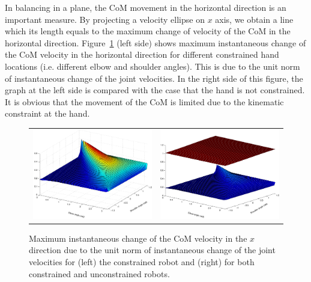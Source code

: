 \documentclass[final,5p,twocolumn]{elsarticle}
\begin{document}
In balancing in a plane, the CoM movement in the horizontal direction is an
important measure. By projecting a velocity ellipse on $x$ axis, we obtain a
line which its length equals to the maximum change of velocity of the CoM in
the horizontal direction. Figure~\ref{type2} (left side) shows maximum
instantaneous change of the CoM velocity in the horizontal direction for
different constrained hand locations (i.e. different elbow and shoulder
angles). This is due to the unit norm of instantaneous change of the joint
velocities. In the right side of this figure, the graph at the left side is
compared with the case that the hand is not constrained. It is obvious that
the movement of the CoM is limited due to the kinematic constraint at the
hand.
\begin{figure}[!t]
  \centering
  \begin{tabular}{lr}
    \includegraphics[width=0.5\linewidth]{images/type2_2.pdf}
    &  
    \includegraphics[width=0.5\linewidth]{images/type2.pdf}
  \end{tabular}
  \caption{Maximum instantaneous change of the CoM velocity in the $x$
    direction due to the unit norm of instantaneous change of the joint
    velocities for (left) the constrained robot and (right) for both
    constrained and unconstrained robots.}
  \label{type2}
\end{figure}
\end{document}
